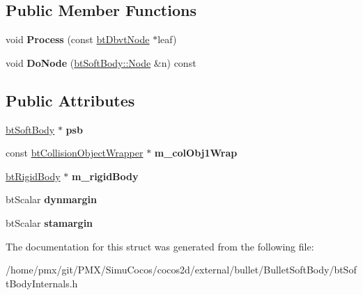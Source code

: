 \subsection*{Public Member Functions}
\begin{DoxyCompactItemize}
\item 
\mbox{\label{structbtSoftColliders_1_1CollideSDF__RS_a26a935dcb4fbad06d8fb0cb1c3db4add}} 
void {\bfseries Process} (const \hyperlink{structbtDbvtNode}{bt\+Dbvt\+Node} $\ast$leaf)
\item 
\mbox{\label{structbtSoftColliders_1_1CollideSDF__RS_a1e7062b76b9200872c219d7ba151dc37}} 
void {\bfseries Do\+Node} (\hyperlink{structbtSoftBody_1_1Node}{bt\+Soft\+Body\+::\+Node} \&n) const
\end{DoxyCompactItemize}
\subsection*{Public Attributes}
\begin{DoxyCompactItemize}
\item 
\mbox{\label{structbtSoftColliders_1_1CollideSDF__RS_a5ad3b9d51e7ec617e8dc6bc3c1a7ebf7}} 
\hyperlink{classbtSoftBody}{bt\+Soft\+Body} $\ast$ {\bfseries psb}
\item 
\mbox{\label{structbtSoftColliders_1_1CollideSDF__RS_aed21a54c9bf459bea26b8e9d20464d7a}} 
const \hyperlink{structbtCollisionObjectWrapper}{bt\+Collision\+Object\+Wrapper} $\ast$ {\bfseries m\+\_\+col\+Obj1\+Wrap}
\item 
\mbox{\label{structbtSoftColliders_1_1CollideSDF__RS_a54908dbec17b9ca6830c5069cb01f72d}} 
\hyperlink{classbtRigidBody}{bt\+Rigid\+Body} $\ast$ {\bfseries m\+\_\+rigid\+Body}
\item 
\mbox{\label{structbtSoftColliders_1_1CollideSDF__RS_a097b8ab40b3052df3d381a0189d7953d}} 
bt\+Scalar {\bfseries dynmargin}
\item 
\mbox{\label{structbtSoftColliders_1_1CollideSDF__RS_a68a8fc30e5cc12c06e6cab04901a013e}} 
bt\+Scalar {\bfseries stamargin}
\end{DoxyCompactItemize}


The documentation for this struct was generated from the following file\+:\begin{DoxyCompactItemize}
\item 
/home/pmx/git/\+P\+M\+X/\+Simu\+Cocos/cocos2d/external/bullet/\+Bullet\+Soft\+Body/bt\+Soft\+Body\+Internals.\+h\end{DoxyCompactItemize}
